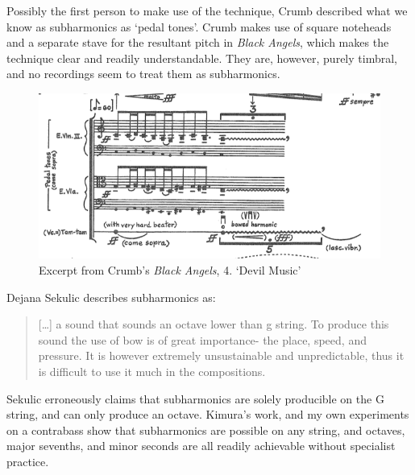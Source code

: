   Possibly the first person to make use of the technique, Crumb described what we know as subharmonics as `pedal tones'.\autocite{crumbBlackAngelsImages1971}
  Crumb makes use of square noteheads and a separate stave for the resultant pitch in \emph{Black Angels}, which makes the technique clear and readily understandable.\autocite[]{crumbBlackAngels1995}
  They are, however, purely timbral, and no recordings seem to treat them as subharmonics.
  
  \begin{figure}
    \includegraphics[width=\linewidth]{./resources/crumbBlackAngels.png}
    \caption{Excerpt from Crumb's \emph{Black Angels}, 4. `Devil Music'}\label{fig:Excerpt from Crumb's Black Angels}\end{figure}

Dejana Sekulic describes subharmonics as:

\begin{quotation}
  [\ldots] a sound that sounds an octave lower than g string. 
  To produce this sound the use of bow is of great importance- the place, speed, and pressure. 
It is however extremely unsustainable and unpredictable, thus it is difficult to use it much in the compositions.\autocite[15]{sekulicYouHearMe2012}\end{quotation}

Sekulic erroneously claims that subharmonics are solely producible on the G string, and can only produce an octave. 
Kimura's work, and my own experiments on a contrabass show that subharmonics are possible on any string, and octaves, major sevenths, and minor seconds are all readily achievable without specialist practice.\autocite[]{kimuraHowProduceSubharmonics1999}




